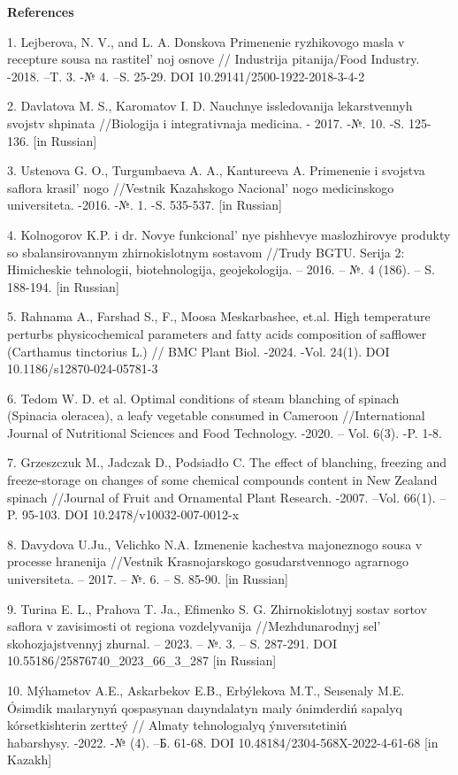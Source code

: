 \begin{center}
{\bfseries References}
\end{center}

\begin{references}
1. Lejberova, N. V., and L. A. Donskova Primenenie ryzhikovogo masla v
recepture sousa na rastitel' noj osnove // Industrija
pitanija/Food Industry. -2018. --T. 3. -№ 4. --S. 25-29. DOI
10.29141/2500-1922-2018-3-4-2

2. Davlatova M. S., Karomatov I. D. Nauchnye issledovanija lekarstvennyh
svojstv shpinata //Biologija i integrativnaja medicina. - 2017. -№. 10.
-S. 125-136. {[}in Russian{]}

3. Ustenova G. O., Turgumbaeva A. A., Kantureeva A. Primenenie i
svojstva saflora krasil' nogo //Vestnik Kazahskogo
Nacional' nogo medicinskogo universiteta. -2016. -№. 1.
-S. 535-537. {[}in Russian{]}

4. Kolnogorov K.P. i dr. Novye funkcional' nye pishhevye
maslozhirovye produkty so sbalansirovannym zhirnokislotnym sostavom
//Trudy BGTU. Serija 2: Himicheskie tehnologii, biotehnologija,
geojekologija. -- 2016. -- №. 4 (186). -- S. 188-194. {[}in Russian{]}

5. Rahnama A., Farshad S., F., Moosa Meskarbashee, et.al. High
temperature perturbs physicochemical parameters and fatty acids
composition of safflower (Carthamus tinctorius L.) // BMC Plant Biol.
-2024. -Vol. 24(1). DOI 10.1186/s12870-024-05781-3

6. Tedom W. D. et al. Optimal conditions of steam blanching of spinach
(Spinacia oleracea), a leafy vegetable consumed in Cameroon
//International Journal of Nutritional Sciences and Food Technology.
-2020. -- Vol. 6(3). -P. 1-8.

7. Grzeszczuk M., Jadczak D., Podsiadło C. The effect of blanching,
freezing and freeze-storage on changes of some chemical compounds
content in New Zealand spinach //Journal of Fruit and Ornamental Plant
Research. -2007. --Vol. 66(1). -- P. 95-103. DOI
10.2478/v10032-007-0012-x

8. Davydova U.Ju., Velichko N.A. Izmenenie kachestva majoneznogo sousa v
processe hranenija //Vestnik Krasnojarskogo gosudarstvennogo agrarnogo
universiteta. -- 2017. -- №. 6. -- S. 85-90. {[}in Russian{]}

9. Turina E. L., Prahova T. Ja., Efimenko S. G. Zhirnokislotnyj sostav
sortov saflora v zavisimosti ot regiona vozdelyvanija //Mezhdunarodnyj
sel' skohozjajstvennyj zhurnal. -- 2023. -- №. 3. -- S.
287-291. DOI 10.55186/25876740\_2023\_66\_3\_287 {[}in Russian{]}

10. Mýhametov A.E., Askarbekov E.B., Erbýlekova M.T., Seısenaly M.E.
Ósimdik maılarynyń qospasynan daıyndalatyn maıly ónimderdiń sapalyq
kórsetkishterin zertteý // Almaty tehnologıalyq ýnıversıtetiniń\\
habarshysy. -2022. -№ (4). --Б. 61-68. DOI
10.48184/2304-568X-2022-4-61-68 {[}in Kazakh{]}
\end{references}

